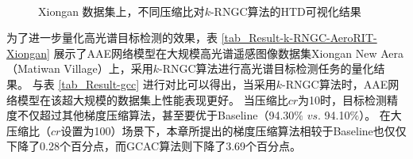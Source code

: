\documentclass{xdupgthesis}
\begin{document}
\begin{figure}[t]
    \centering
     \\
    \caption{Xiongan 数据集上，不同压缩比对$k$-RNGC算法的HTD可视化结果}
    \label{fig_Result-Xiongan-chapter4}
\end{figure}

为了进一步量化高光谱目标检测的效果，表 \ref*{tab_Result-k-RNGC-AeroRIT-Xiongan} 展示了AAE网络模型在大规模高光谱遥感图像数据集Xiongan New Aera（Matiwan Village）上，采用$k$-RNGC算法进行高光谱目标检测任务的量化结果。
与表 \ref*{tab_Result-gcc} 进行对比可以得出，当采用$k$-RNGC算法时，AAE网络模型在该超大规模的数据集上性能表现更好。
当压缩比$cr$为10时，目标检测精度不仅超过其他梯度压缩算法，甚至要优于Baseline（94.30$\%$ $vs.$ 94.10$\%$）。
在大压缩比（$cr$设置为100）场景下，本章所提出的梯度压缩算法相较于Baseline也仅仅下降了0.28个百分点，而GCAC算法则下降了3.69个百分点。
\end{document}
